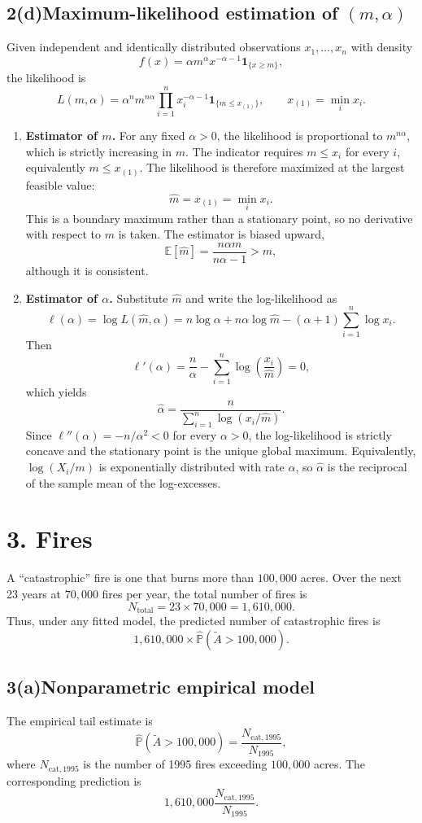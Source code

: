 \documentclass[11pt,letterpaper]{article}
\newcommand{\problem}[2]{\section*{#1. #2}}
\newcommand{\problemPart}[2]{\subsection*{#1\quad #2}}
\newcommand{\E}{\mathbb{E}}
\newcommand{\Prob}{\mathbb{P}}
\newcommand{\mhat}{\widehat m}
\newcommand{\alphahat}{\widehat\alpha}
\begin{document}
\problemPart{2(d)}{Maximum-likelihood estimation of $(m,\alpha)$}

Given independent and identically distributed observations $x_1,\ldots,x_n$ with density
\[
  f(x)=\alpha m^\alpha x^{-\alpha-1}\bm{1}_{\{x\ge m\}},
\]
the likelihood is
\[
  L(m,\alpha)
  =\alpha^n m^{n\alpha}\prod_{i=1}^n x_i^{-\alpha-1}
   \bm{1}_{\{m\le x_{(1)}\}},
  \qquad x_{(1)}=\min_i x_i.
\]

\begin{enumerate}[label=\textbf{\arabic*.},leftmargin=2.1em,itemsep=7pt]
\item \textbf{Estimator of $m$.} For any fixed $\alpha>0$, the likelihood is proportional to $m^{n\alpha}$, which is strictly increasing in $m$. The indicator requires $m\le x_i$ for every $i$, equivalently $m\le x_{(1)}$. The likelihood is therefore maximized at the largest feasible value:
\[
  \boxed{\mhat=x_{(1)}=\min_i x_i.}
\]
This is a boundary maximum rather than a stationary point, so no derivative with respect to $m$ is taken. The estimator is biased upward,
\[
  \E[\mhat]=\frac{n\alpha m}{n\alpha-1}>m,
\]
although it is consistent.

\item \textbf{Estimator of $\alpha$.} Substitute $\mhat$ and write the log-likelihood as
\[
  \ell(\alpha)
  =\log L(\mhat,\alpha)
  =n\log\alpha+n\alpha\log\mhat-(\alpha+1)\sum_{i=1}^n\log x_i.
\]
Then
\[
  \ell'(\alpha)
  =\frac{n}{\alpha}-\sum_{i=1}^n\log\left(\frac{x_i}{\mhat}\right)=0,
\]
which yields
\[
  \boxed{
  \alphahat=\frac{n}{\displaystyle\sum_{i=1}^n
  \log\left(x_i/\mhat\right)}.}
\]
Since $\ell''(\alpha)=-n/\alpha^2<0$ for every $\alpha>0$, the log-likelihood is strictly concave and the stationary point is the unique global maximum. Equivalently, $\log(X_i/m)$ is exponentially distributed with rate $\alpha$, so $\alphahat$ is the reciprocal of the sample mean of the log-excesses.
\end{enumerate}

\FloatBarrier
\problem{3}{Fires}

A ``catastrophic'' fire is one that burns more than $100{,}000$ acres. Over the next 23 years at $70{,}000$ fires per year, the total number of fires is
\[
  N_{\mathrm{total}}=23\times70{,}000=1{,}610{,}000.
\]
Thus, under any fitted model, the predicted number of catastrophic fires is
\[
  1{,}610{,}000\times\widehat{\Prob}(\widetilde A>100{,}000).
\]

\problemPart{3(a)}{Nonparametric empirical model}

The empirical tail estimate is
\[
  \widehat{\Prob}(\widetilde A>100{,}000)
  =\frac{N_{\mathrm{cat},1995}}{N_{1995}},
\]
where $N_{\mathrm{cat},1995}$ is the number of 1995 fires exceeding $100{,}000$ acres. The corresponding prediction is
\[
  1{,}610{,}000\frac{N_{\mathrm{cat},1995}}{N_{1995}}.
\]
\end{document}
